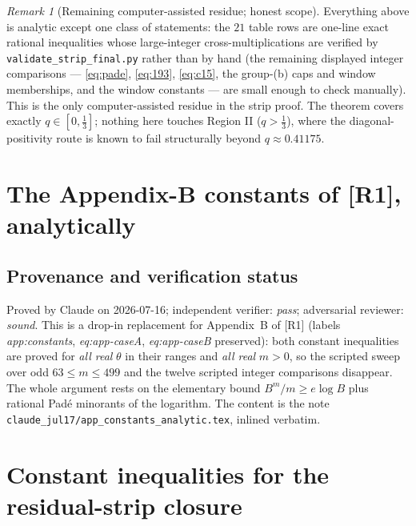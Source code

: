 \documentclass[11pt]{article}
\theoremstyle{remark}
\newtheorem{remark}[theorem]{Remark}
\theoremstyle{plain}
\theoremstyle{plain}
\begin{document}
\begin{remark}[Remaining computer-assisted residue; honest scope]\label{rmk:residue}
Everything above is analytic except one class of statements: the $21$ table rows are one-line exact rational inequalities whose large-integer cross-multiplications are verified by \texttt{validate\_strip\_final.py} rather than by hand (the remaining displayed integer comparisons --- \eqref{eq:pade}, \eqref{eq:193}, \eqref{eq:c15}, the group-(b) caps and window memberships, and the window constants --- are small enough to check manually).  This is the only computer-assisted residue in the strip proof.  The theorem covers exactly $q\in[0,\tfrac13]$; nothing here touches Region II ($q>\tfrac13$), where the diagonal-positivity route is known to fail structurally beyond $q\approx0.41175$.
\end{remark}



\section{The Appendix-B constants of [R1], analytically}\label{sec:appconst}

\subsection*{Provenance and verification status}
Proved by Claude on 2026-07-16; independent verifier: \emph{pass};
adversarial reviewer: \emph{sound}.  This is a drop-in replacement for
Appendix~B of [R1] (labels \emph{app:constants}, \emph{eq:app-caseA},
\emph{eq:app-caseB} preserved): both constant inequalities are proved for
\emph{all real} $\theta$ in their ranges and \emph{all real} $m>0$, so the
scripted sweep over odd $63\le m\le499$ and the twelve scripted integer
comparisons disappear.  The whole argument rests on the elementary bound
$B^m/m\ge e\log B$ plus rational Pad\'e minorants of the logarithm.  The
content is the note \texttt{claude\_jul17/app\_constants\_analytic.tex},
inlined verbatim.

\section{Constant inequalities for the residual-strip closure}\label{app:constants}
\end{document}
